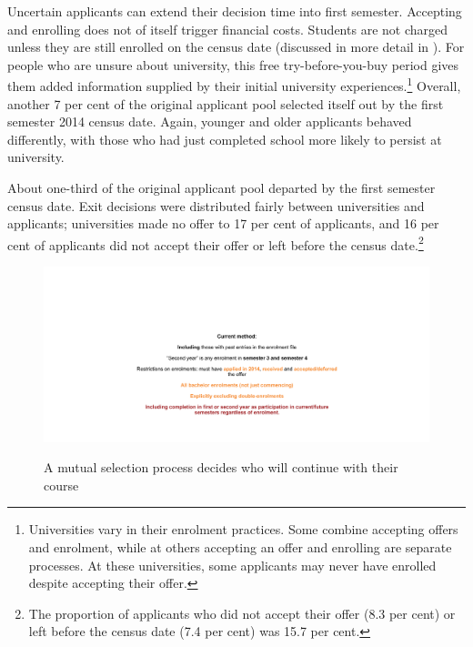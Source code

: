 Uncertain applicants can extend their decision time into first semester. Accepting and enrolling does not of itself trigger financial costs. Students are not charged unless they are still enrolled on the census date (discussed in more detail in ). For people who are unsure about university, this free try-before-you-buy period gives them added information supplied by their initial university experiences.\footnote{Universities vary in their enrolment practices. Some combine accepting offers and enrolment, while at others accepting an offer and enrolling are separate processes. At these universities, some applicants may never have enrolled despite accepting their offer.} Overall, another 7 per cent of the original applicant pool selected itself out by the first semester 2014 census date. Again, younger and older applicants behaved differently, with those who had just completed school more likely to persist at university.

About one-third of the original applicant pool departed by the first semester census date. Exit decisions were distributed fairly between universities and applicants; universities made no offer to 17 per cent of applicants, and 16 per cent of applicants did not accept their offer or left before the census date.\footnote{The proportion of applicants who did not accept their offer (8.3 per cent) or left before the census date (7.4 per cent) was 15.7 per cent.}

                
                \begin{figure}
                    \caption{A mutual selection process decides who will continue with their course\label{fig:2}}%
                    \includegraphics[page=2, width=2.15\columnwidth]{atlas/transition_fullpage.pdf} 
                    {\textcite{DepartmentofEducationandTraininga}}
                \end{figure}



